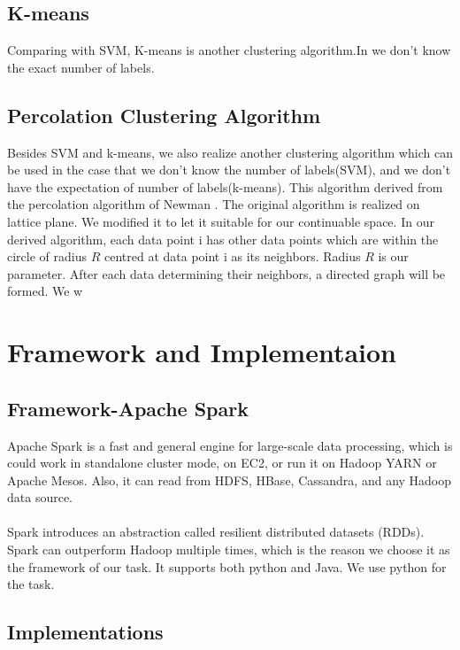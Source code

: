 \documentclass[a4paper]{article}
\begin{document}
\subsection{K-means}

Comparing with SVM, K-means is another clustering algorithm.In  we don't know the exact number of labels. 

\subsection{Percolation Clustering Algorithm}

Besides SVM and k-means, we also realize another clustering algorithm which can be used in the case that we don't know the number of labels(SVM), and we don't have the expectation of number of labels(k-means). This algorithm derived from the percolation algorithm of Newman \cite{}.  The original algorithm is realized on lattice plane. We modified it to let it suitable for our continuable space. 
In our derived algorithm, each data point i has other data points which are within the circle of radius  $R$ centred at data point i as its neighbors.
Radius $R$ is our parameter. After each data determining their neighbors, a directed graph will be formed. We w 

\section{Framework and Implementaion}
\subsection{Framework-Apache Spark}
Apache Spark is a fast and general engine for large-scale data processing, which is could work in standalone cluster mode, on EC2, or run it on Hadoop YARN or Apache Mesos. Also, it can read from HDFS, HBase, Cassandra, and any Hadoop data source.\\
\\
Spark introduces an abstraction called resilient distributed datasets (RDDs). Spark can outperform Hadoop multiple times, which is the reason we choose it as the framework of our task. It supports both python and Java. We use python for the task. 





\subsection{Implementations}
\end{document}
